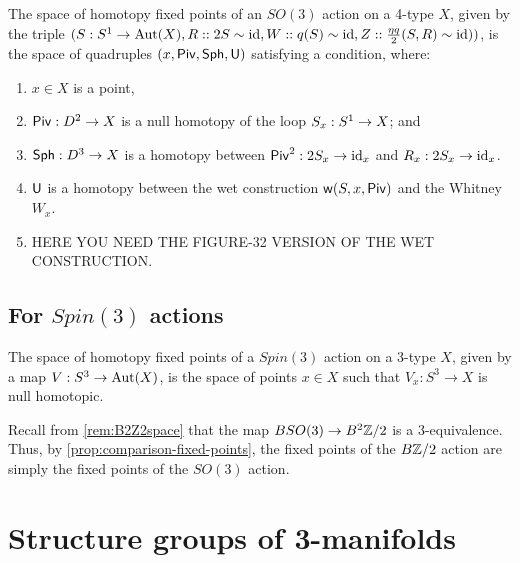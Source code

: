 \documentclass{amsart}
\begin{document}
\begin{remark}
The space of homotopy fixed points of an $SO(3)$ action on a 4-type $X$, given by the triple $(S: S^1 \rightarrow \mathrm{Aut}(X),R:: 2 S \sim \mathrm{id},W:: q(S) \sim \mathrm{id}, Z:: \frac{\eta q}{2} (S,R) \sim \mathrm{id}) )$, is the space of quadruples $(x, \mathsf{Piv}, \mathsf{Sph}, \mathsf{U})$ satisfying a condition, where:
\begin{enumerate}
\item $x \in X$ is a point,
\item $\mathsf{Piv}: D^2 \rightarrow X$ is a null homotopy of the loop $S_x: S^1 \rightarrow X$; and
\item $\mathsf{Sph}: D^3 \rightarrow X$ is a homotopy between $\mathsf{Piv}^2 : 2 S_x \rightarrow \mathrm{id}_x$ and $R_x: 2 S_x \rightarrow \mathrm{id}_x$.
\item $\mathsf{U}$ is a homotopy between the wet construction $\mathsf{w}(S,x,\mathsf{Piv})$ and the Whitney $W_x$.
\item HERE YOU NEED THE FIGURE-32 VERSION OF THE WET CONSTRUCTION.
\end{enumerate}
\end{remark}

\subsection{For $Spin(3)$ actions} 

\begin{proposition}
The space of homotopy fixed points of a $Spin(3)$ action on a 3-type $X$, given by a map $V: S^3 \rightarrow \mathrm{Aut}(X)$, is the space of points $x \in X$ such that $V_x : S^3 \to X$ is null homotopic.
\end{proposition}

\begin{remark}
\label{rem:fixed-points-bz2}
Recall from \cref{rem:B2Z2space} that the map $BSO(3) \to B^2\mathbb Z/2$ is a 3-equivalence. Thus, by \cref{prop:comparison-fixed-points}, the fixed points of the $B \mathbb Z/2$ action are simply the fixed points of the $SO(3)$ action.
\end{remark}



\appendix
{}
\setcounter{theorem}{0}

\section{Structure groups of 3-manifolds} \label{sec-lft-struc}
\end{document}
